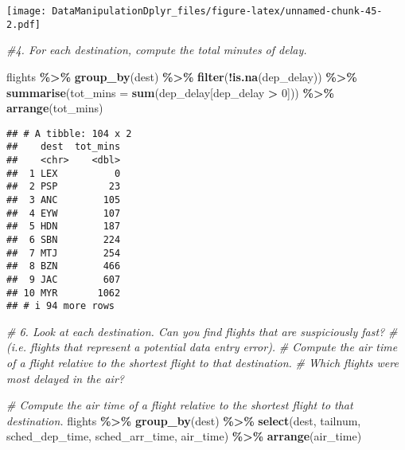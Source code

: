 \documentclass[
]{article}
\newenvironment{Shaded}{\begin{snugshade}}{\end{snugshade}}
\newcommand{\AttributeTok}[1]{\textcolor[rgb]{0.13,0.29,0.53}{#1}}
\newcommand{\CommentTok}[1]{\textcolor[rgb]{0.56,0.35,0.01}{\textit{#1}}}
\newcommand{\DecValTok}[1]{\textcolor[rgb]{0.00,0.00,0.81}{#1}}
\newcommand{\FunctionTok}[1]{\textcolor[rgb]{0.13,0.29,0.53}{\textbf{#1}}}
\newcommand{\NormalTok}[1]{#1}
\newcommand{\SpecialCharTok}[1]{\textcolor[rgb]{0.81,0.36,0.00}{\textbf{#1}}}
\begin{document}
\texttt{[image: DataManipulationDplyr\_files/figure-latex/unnamed-chunk-45-2.pdf]}

\begin{Shaded}
\begin{Highlighting}[]
\CommentTok{\#4. For each destination, compute the total minutes of delay. }

\NormalTok{flights }\SpecialCharTok{\%\textgreater{}\%}
  \FunctionTok{group\_by}\NormalTok{(dest) }\SpecialCharTok{\%\textgreater{}\%}
  \FunctionTok{filter}\NormalTok{(}\SpecialCharTok{!}\FunctionTok{is.na}\NormalTok{(dep\_delay)) }\SpecialCharTok{\%\textgreater{}\%}
  \FunctionTok{summarise}\NormalTok{(}\AttributeTok{tot\_mins =} \FunctionTok{sum}\NormalTok{(dep\_delay[dep\_delay }\SpecialCharTok{\textgreater{}} \DecValTok{0}\NormalTok{])) }\SpecialCharTok{\%\textgreater{}\%}
  \FunctionTok{arrange}\NormalTok{(tot\_mins)}
\end{Highlighting}
\end{Shaded}

\begin{verbatim}
## # A tibble: 104 x 2
##    dest  tot_mins
##    <chr>    <dbl>
##  1 LEX          0
##  2 PSP         23
##  3 ANC        105
##  4 EYW        107
##  5 HDN        187
##  6 SBN        224
##  7 MTJ        254
##  8 BZN        466
##  9 JAC        607
## 10 MYR       1062
## # i 94 more rows
\end{verbatim}

\begin{Shaded}
\begin{Highlighting}[]
\CommentTok{\# 6. Look at each destination. Can you find flights that are suspiciously fast? }
\CommentTok{\# (i.e. flights that represent a potential data entry error). }
\CommentTok{\# Compute the air time of a flight relative to the shortest flight to that destination. }
\CommentTok{\# Which flights were most delayed in the air?}


\CommentTok{\# Compute the air time of a flight relative to the shortest flight to that destination. }
\NormalTok{flights }\SpecialCharTok{\%\textgreater{}\%}
  \FunctionTok{group\_by}\NormalTok{(dest) }\SpecialCharTok{\%\textgreater{}\%}
  \FunctionTok{select}\NormalTok{(dest, tailnum, sched\_dep\_time, sched\_arr\_time, air\_time) }\SpecialCharTok{\%\textgreater{}\%}
  \FunctionTok{arrange}\NormalTok{(air\_time) }
\end{Highlighting}
\end{Shaded}
\end{document}
